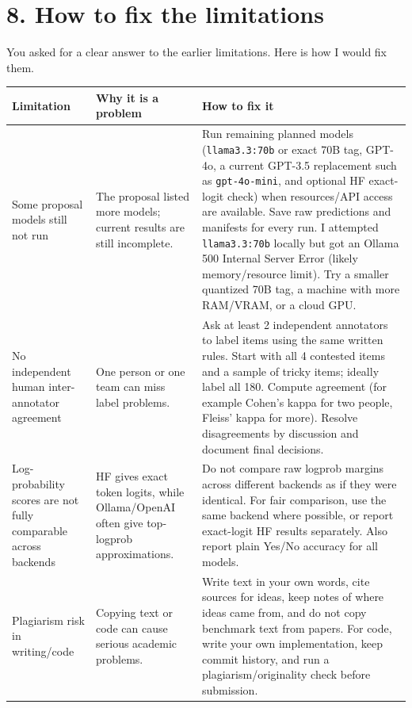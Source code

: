 \documentclass[11pt, a4paper]{article}
\begin{document}
\FloatBarrier
{}
\section*{\color{bambergnavy} 8. How to fix the limitations}
You asked for a clear answer to the earlier limitations. Here is how I would fix them.

\begin{table}[htbp]
\centering
\small
\setlength{\tabcolsep}{6pt}
\renewcommand{\arraystretch}{1.3}
\begin{tabularx}{\textwidth}{>{\raggedright\arraybackslash}p{3.5cm} >{\raggedright\arraybackslash}p{4.3cm} >{\raggedright\arraybackslash}X}
\toprule
\rowcolor{labeltint}
\textbf{Limitation} & \textbf{Why it is a problem} & \textbf{How to fix it} \\
\midrule
Some proposal models still not run & The proposal listed more models; current results are still incomplete. & Run remaining planned models (\texttt{llama3.3:70b} or exact 70B tag, GPT-4o, a current GPT-3.5 replacement such as \texttt{gpt-4o-mini}, and optional HF exact-logit check) when resources/API access are available. Save raw predictions and manifests for every run. I attempted \texttt{llama3.3:70b} locally but got an Ollama 500 Internal Server Error (likely memory/resource limit). Try a smaller quantized 70B tag, a machine with more RAM/VRAM, or a cloud GPU. \\
\rowcolor{rowtint}
No independent human inter-annotator agreement & One person or one team can miss label problems. & Ask at least 2 independent annotators to label items using the same written rules. Start with all 4 contested items and a sample of tricky items; ideally label all 180. Compute agreement (for example Cohen's kappa for two people, Fleiss' kappa for more). Resolve disagreements by discussion and document final decisions. \\
Log-probability scores are not fully comparable across backends & HF gives exact token logits, while Ollama/OpenAI often give top-logprob approximations. & Do not compare raw logprob margins across different backends as if they were identical. For fair comparison, use the same backend where possible, or report exact-logit HF results separately. Also report plain Yes/No accuracy for all models. \\
\rowcolor{rowtint}
Plagiarism risk in writing/code & Copying text or code can cause serious academic problems. & Write text in your own words, cite sources for ideas, keep notes of where ideas came from, and do not copy benchmark text from papers. For code, write your own implementation, keep commit history, and run a plagiarism/originality check before submission. \\

\end{tabularx}
\end{table}
\end{document}
